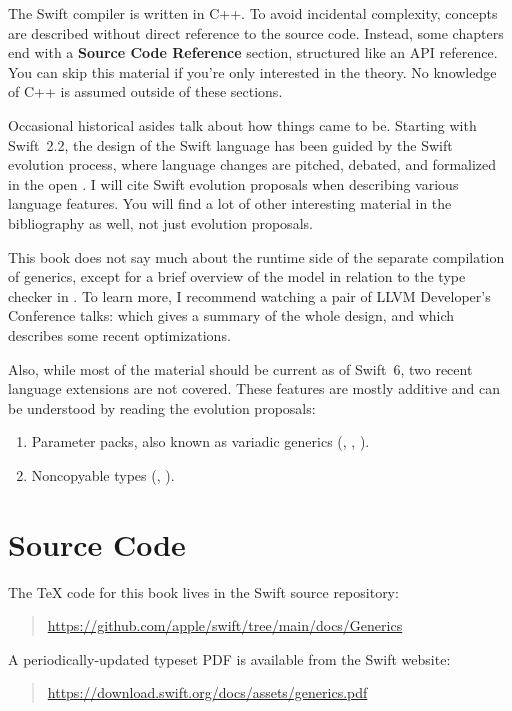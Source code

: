\documentclass[../generics]{subfiles}
\begin{document}
The Swift compiler is written in C++. To avoid incidental complexity, concepts are described without direct reference to the source code. Instead, some chapters end with a \textbf{Source Code Reference} section, structured like an API reference. You can skip this material if you're only interested in the theory. No knowledge of C++ is assumed outside of these sections.

Occasional historical asides talk about how things came to be. Starting with Swift~2.2, the design of the Swift language has been guided by the Swift evolution process, where language changes are pitched, debated, and formalized in the open \cite{evolution}. I will cite Swift evolution proposals when describing various language features. You will find a lot of other interesting material in the bibliography as well, not just evolution proposals.

This book does not say much about the runtime side of the separate compilation of generics, except for a brief overview of the model in relation to the type checker in . To learn more, I recommend watching a pair of LLVM Developer's Conference talks: \cite{llvmtalk} which gives a summary of the whole design, and \cite{cvwtalk} which describes some recent optimizations.

Also, while most of the material should be current as of Swift~6, two recent language extensions are not covered. These features are mostly additive and can be understood by reading the evolution proposals:
\begin{enumerate}
\item {}Parameter packs, also known as variadic generics (\cite{se0393}, \cite{se0398}, \cite{se0399}).
\item {}Noncopyable types (\cite{se0390}, \cite{se0427}).
\end{enumerate}

\section*{Source Code}

The \TeX{} code for this book lives in the Swift source repository:
\begin{quote}
\url{https://github.com/apple/swift/tree/main/docs/Generics}
\end{quote}
A periodically-updated typeset PDF is available from the Swift website:
\begin{quote}
\url{https://download.swift.org/docs/assets/generics.pdf}
\end{quote}
\end{document}
